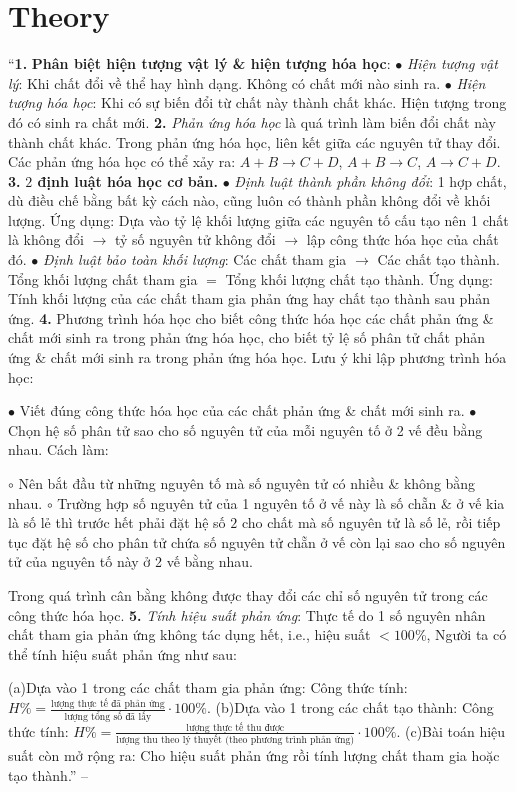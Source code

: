 \documentclass{article}
\numberwithin{equation}{section}
\begin{document}
\section*{Theory}
``{\bf 1.} \textbf{Phân biệt hiện tượng vật lý \& hiện tượng hóa học}: 	$\bullet$ \textit{Hiện tượng vật lý}: Khi chất đổi về thể hay hình dạng. Không có chất mới nào sinh ra. $\bullet$ \textit{Hiện tượng hóa học}: Khi có sự biến đổi từ chất này thành chất khác. Hiện tượng trong đó có sinh ra chất mới. {\bf 2.} \textit{Phản ứng hóa học} là quá trình làm biến đổi chất này thành chất khác. Trong phản ứng hóa học, liên kết giữa các nguyên tử thay đổi. Các phản ứng hóa học có thể xảy ra: $A + B\to C + D$, $A + B\to C$, $A\to C + D$. {\bf 3.} \textbf{$2$ định luật hóa học cơ bản.} $\bullet$ \textit{Định luật thành phần không đổi}: 1 hợp chất, dù điều chế bằng bất kỳ cách nào, cũng luôn có thành phần không đổi về khối lượng. Ứng dụng: Dựa vào tỷ lệ khối lượng giữa các nguyên tố cấu tạo nên 1 chất là không đổi $\to$ tỷ số nguyên tử không đổi $\to$ lập công thức hóa học của chất đó. $\bullet$ \textit{Định luật bảo toàn khối lượng}: Các chất tham gia $\to$ Các chất tạo thành. Tổng khối lượng chất tham gia $=$ Tổng khối lượng chất tạo thành. Ứng dụng: Tính khối lượng của các chất tham gia phản ứng hay chất tạo thành sau phản ứng. {\bf 4.} Phương trình hóa học cho biết công thức hóa học các chất phản ứng \& chất mới sinh ra trong phản ứng hóa học, cho biết tỷ lệ số phân tử chất phản ứng \& chất mới sinh ra trong phản ứng hóa học. Lưu ý khi lập phương trình hóa học:
	
		$\bullet$ Viết đúng công thức hóa học của các chất phản ứng \& chất mới sinh ra.
		$\bullet$ Chọn hệ số phân tử sao cho số nguyên tử của mỗi nguyên tố ở 2 vế đều bằng nhau. Cách làm:
		
			$\circ$ Nên bắt đầu từ những nguyên tố mà số nguyên tử có nhiều \& không bằng nhau.
			$\circ$ Trường hợp số nguyên tử của 1 nguyên tố ở vế này là số chẵn \& ở vế kia là số lẻ thì trước hết phải đặt hệ số $2$ cho chất mà số nguyên tử là số lẻ, rồi tiếp tục đặt hệ số cho phân tử chứa số nguyên tử chẵn ở vế còn lại sao cho số nguyên tử của nguyên tố này ở 2 vế bằng nhau.
		
	
	Trong quá trình cân bằng không được thay đổi các chỉ số nguyên tử trong các công thức hóa học.
	{\bf 5.} \textit{Tính hiệu suất phản ứng}: Thực tế do 1 số nguyên nhân chất tham gia phản ứng không tác dụng hết, i.e., hiệu suất $< 100$\%, Người ta có thể tính hiệu suất phản ứng như sau:
	
		(a)Dựa vào 1 trong các chất tham gia phản ứng: Công thức tính: $H\% = \frac{\mbox{lượng thực tế đã phản ứng}}{\mbox{lượng tổng số đã lấy}}\cdot100\%$.
		(b)Dựa vào 1 trong các chất tạo thành: Công thức tính: $H\% = \frac{\mbox{lượng thực tế thu được}}{\mbox{lượng thu theo lý thuyết (theo phương trình phản ứng)}}\cdot100\%$.
		(c)Bài toán hiệu suất còn mở rộng ra: Cho hiệu suất phản ứng rồi tính lượng chất tham gia hoặc tạo thành.'' -- \cite[Chap. 2, pp. 44--46]{An_400_BT_Hoa_Hoc_8_2020}
	
\end{document}
